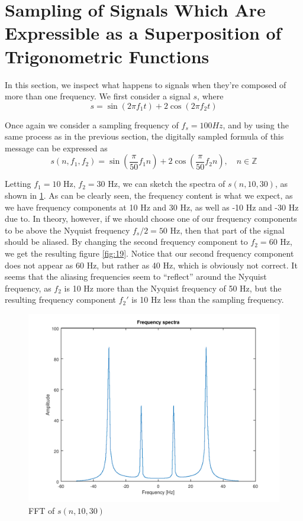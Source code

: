 \documentclass[a4paper, 12pt]{report}
\begin{document}
		\section{Sampling of Signals Which Are Expressible as a Superposition of Trigonometric Functions} %
		\label{sec:sampling_superposition_of_trigonometric_functions}
			In this section, we inspect what happens to signals when they're composed of more than one frequency. We first consider a signal $s$, where
			\[
				s = \sin(2\pi f_1t) + 2\cos(2\pi f_2 t)
			\]

			Once again we consider a sampling frequency of $f_s = 100 Hz$, and by using the same process as in the previous section, the digitally sampled formula of this message can be expressed as
			\[
				s(n, f_1, f_2) = \sin\left(\frac{\pi}{50} f_1 n\right) + 2\cos\left(\frac{\pi}{50} f_2 n\right), \quad n \in \mathbb{Z}
			\]

			Letting $f_1=10 \text{ Hz},\, f_2 = 30 \text{ Hz}$, we can sketch the spectra of $s(n, 10, 30)$, as shown in \ref{fig:18}. As can be clearly seen, the frequency content is what we expect, as we have frequency components at 10 Hz and 30 Hz, as well as -10 Hz and -30 Hz due to. In theory, however, if we should choose one of our frequency components to be above the Nyquist frequency $f_s/2 = 50$ Hz, then that part of the signal should be aliased. By changing the second frequency component to $f_2 = 60$ Hz, we get the resulting figure \ref{fig:19}. Notice that our second frequency component does not appear as 60 Hz, but rather as 40 Hz, which is obviously not correct. It seems that the aliasing frequencies seem to ``reflect'' around the Nyquist frequency, as $f_2$ is 10 Hz more than the Nyquist frequency of 50 Hz, but the resulting frequency component $f_2'$ is 10 Hz less than the sampling frequency.

			\begin{figure}[H]
				\label{fig:18}
				\includegraphics[width=\textwidth]{img/1_18.png}
				\caption{FFT of $s(n, 10, 30)$}
			\end{figure}
\end{document}
